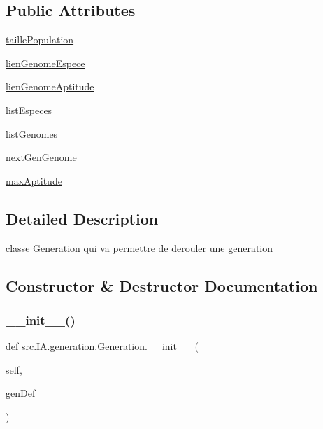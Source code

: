 \subsection*{Public Attributes}
\begin{DoxyCompactItemize}
\item 
\hyperlink{classsrc_1_1_i_a_1_1generation_1_1_generation_a289b8af8c8cf5a43f6938ac3da049be6}{taille\+Population}
\item 
\hyperlink{classsrc_1_1_i_a_1_1generation_1_1_generation_a5823d34110f87559ab5dc4a98afe7998}{lien\+Genome\+Espece}
\item 
\hyperlink{classsrc_1_1_i_a_1_1generation_1_1_generation_acebe71008688e50ea888f0c04e9e48df}{lien\+Genome\+Aptitude}
\item 
\hyperlink{classsrc_1_1_i_a_1_1generation_1_1_generation_aad01f3386b8cbb8330b35cd19b309fd2}{list\+Especes}
\item 
\hyperlink{classsrc_1_1_i_a_1_1generation_1_1_generation_ae98a08f378f6fbf32f19c0040b939edf}{list\+Genomes}
\item 
\hyperlink{classsrc_1_1_i_a_1_1generation_1_1_generation_abbb9024da18de7bf0ad95386ead3c317}{next\+Gen\+Genome}
\item 
\hyperlink{classsrc_1_1_i_a_1_1generation_1_1_generation_ac2ec6362a7cffed8c05bf5fb8b3b28b6}{max\+Aptitude}
\end{DoxyCompactItemize}


\subsection{Detailed Description}
classe \hyperlink{classsrc_1_1_i_a_1_1generation_1_1_generation}{Generation} qui va permettre de derouler une generation 

\subsection{Constructor \& Destructor Documentation}
\mbox{\label{classsrc_1_1_i_a_1_1generation_1_1_generation_af1a9b4e0d54cf2d95b643ee32f0a7785}} 
\subsubsection{\texorpdfstring{\+\_\+\+\_\+init\+\_\+\+\_\+()}{\_\_init\_\_()}}
{\footnotesize\ttfamily def src.\+I\+A.\+generation.\+Generation.\+\_\+\+\_\+init\+\_\+\+\_\+ (\begin{DoxyParamCaption}\item[{}]{self,  }\item[{}]{gen\+Def }\end{DoxyParamCaption})}



